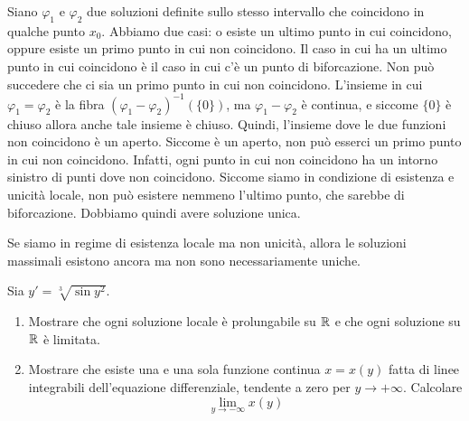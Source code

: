 \documentclass[a4paper]{article}
\begin{document}
\begin{radioactive}
\begin{snippetproof}{}
    Siano \(\varphi_1\) e \(\varphi_2\) due soluzioni definite sullo stesso intervallo che coincidono in qualche
    punto \(x_0\).
    Abbiamo due casi: o esiste un ultimo punto in cui coincidono, oppure esiste un primo punto in cui non coincidono.
    Il caso in cui ha un ultimo punto in cui coincidono è il caso in cui c'è un punto di biforcazione.
    Non può succedere che ci sia un primo punto in cui non coincidono.
    L'insieme in cui \(\varphi_1 = \varphi_2\)
    è la fibra \((\varphi_1 - \varphi_2)^{-1}(\{0\})\), ma \(\varphi_1 - \varphi_2\)
    è continua, e siccome \(\{0\}\) è chiuso allora anche tale insieme è chiuso.
    Quindi, l'insieme dove le due funzioni non coincidono è un aperto.
    Siccome è un aperto, non può esserci un primo punto in cui non coincidono.
    Infatti, ogni punto in cui non coincidono ha un intorno sinistro di punti dove non coincidono.
    Siccome siamo in condizione di esistenza e unicità locale, non può esistere nemmeno l'ultimo punto, che sarebbe
    di biforcazione. Dobbiamo quindi avere soluzione unica.
\end{snippetproof}
\end{radioactive}

\begin{radioactive}
Se siamo in regime di esistenza locale ma non unicità, allora le soluzioni massimali esistono ancora
ma non sono necessariamente uniche.
\end{radioactive}

\begin{radioactive}
\begin{snippetexercise}{}
    Sia \(y' = \sqrt[3]{\sin y^2}\).
    \begin{enumerate}
        \item Mostrare che ogni soluzione locale è prolungabile su \(\mathbb{R}\) e che ogni soluzione
            su \(\mathbb{R}\) è limitata.
        \item Mostrare che esiste una e una sola
            funzione continua \(x = x(y)\) fatta di linee integrabili
            dell'equazione differenziale, tendente a zero per \(y \to +\infty\).
            Calcolare \[
                \lim_{y \to -\infty} x(y)
            \]
    \end{enumerate}
\end{snippetexercise}
\end{radioactive}
\end{document}
